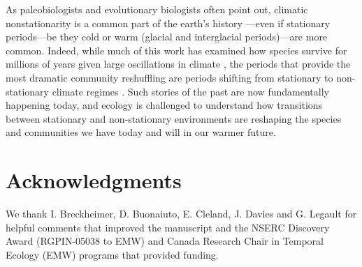 \documentclass[11pt,letterpaper]{article}
\begin{document}
As paleobiologists and evolutionary biologists often point out, climatic nonstationarity is a common part of the earth's history \citep{Jansson:2002nz}---even if stationary periods---be they cold or warm (glacial and interglacial periods)---are more common. Indeed, while much of this work has examined how species survive for millions of years given large oscillations in climate \citep{provan2008}, the periods that provide the most dramatic community reshuffling are periods shifting from stationary to non-stationary climate regimes \citep{vrba1980,vrba1985}. Such stories of the past are now fundamentally happening today, and ecology is challenged to understand how transitions between stationary and non-stationary environments are reshaping the species and communities we have today and will in our warmer future. 

\section{Acknowledgments}
We thank I. Breckheimer, D. Buonaiuto, E. Cleland, J. Davies and G. Legault for helpful comments that improved the manuscript and the NSERC Discovery Award (RGPIN-05038 to EMW) and Canada Research Chair in Temporal Ecology (EMW) programs that provided funding. 


\end{document}

